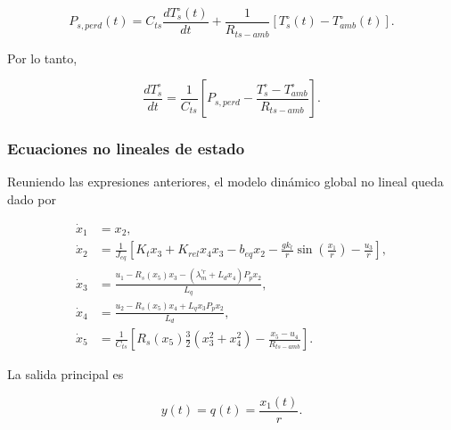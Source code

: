 \documentclass[10pt,a4paper]{article}
\begin{document}
\begin{equation}
    P_{s,perd}(t)
    =
    C_{ts}\frac{dT_s^{\circ}(t)}{dt}
    +
    \frac{1}{R_{ts-amb}}
    \left[T_s^{\circ}(t)-T_{amb}^{\circ}(t)\right].
    \label{eq:balance_termico}
\end{equation}

Por lo tanto,

\begin{equation}
    \frac{dT_s^{\circ}}{dt}
    =
    \frac{1}{C_{ts}}
    \left[
    P_{s,perd}
    -
    \frac{T_s^{\circ}-T_{amb}^{\circ}}{R_{ts-amb}}
    \right].
    \label{eq:ts_dot}
\end{equation}

\subsubsection{Ecuaciones no lineales de estado}

Reuniendo las expresiones anteriores, el modelo dinámico global no lineal queda dado por

\begin{equation}
    \boxed{
    \begin{aligned}
        \dot{x}_1 &= x_2,\\[2mm]
        \dot{x}_2 &=
        \frac{1}{J_{eq}}
        \left[
        K_t x_3
        +
        K_{rel}x_4x_3
        -
        b_{eq}x_2
        -
        \frac{gk_l}{r}\sin\left(\frac{x_1}{r}\right)
        -
        \frac{u_3}{r}
        \right],\\[2mm]
        \dot{x}_3 &=
        \frac{
        u_1
        -
        R_s(x_5)x_3
        -
        \left(\lambda_m^{\prime r}+L_d x_4\right)P_p x_2
        }{L_q},\\[2mm]
        \dot{x}_4 &=
        \frac{
        u_2
        -
        R_s(x_5)x_4
        +
        L_q x_3 P_p x_2
        }{L_d},\\[2mm]
        \dot{x}_5 &=
        \frac{1}{C_{ts}}
        \left[
        R_s(x_5)\frac{3}{2}\left(x_3^2+x_4^2\right)
        -
        \frac{x_5-u_4}{R_{ts-amb}}
        \right].
    \end{aligned}
    }
    \label{eq:modelo_global_nl}
\end{equation}

La salida principal es

\begin{equation}
    y(t)=q(t)=\frac{x_1(t)}{r}.
    \label{eq:salida_global_nl}
\end{equation}
\end{document}
